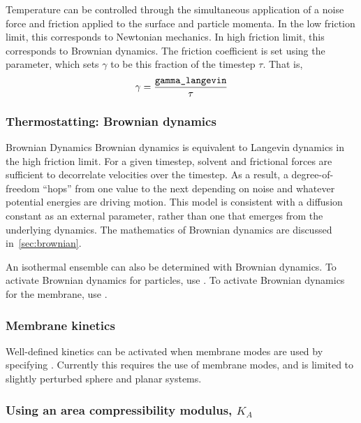 Temperature can be controlled through the simultaneous application of a noise force and friction applied to the surface and particle momenta.
In the low friction limit, this corresponds to Newtonian mechanics.
In high friction limit, this corresponds to Brownian dynamics.
The friction coefficient is set using the  parameter, which sets $\gamma$ to be this fraction of the timestep $\tau$.
That is,
\begin{equation}
\gamma = \frac{\textrm{\texttt{gamma\_langevin}}}{\tau} 
\end{equation} 

\subsubsection{Thermostatting: Brownian dynamics}

\begin{bcomment}{Brownian Dynamics}
Brownian dynamics is equivalent to Langevin dynamics in the high friction limit.
For a given timestep, solvent and frictional forces are sufficient to decorrelate velocities over the timestep.
As a result, a degree-of-freedom ``hops'' from one value to the next depending on noise and whatever potential energies are driving motion.
This model is consistent with a diffusion constant as an external parameter, rather than one that emerges from the underlying dynamics.  
The mathematics of Brownian dynamics are discussed in~\cref{sec:brownian}.
\end{bcomment}

An isothermal ensemble can also be determined with Brownian dynamics.
To activate Brownian dynamics for particles, use .
To activate Brownian dynamics for the membrane, use .

\subsubsection{Membrane kinetics}

Well-defined kinetics can be activated when membrane modes are used by specifying .
Currently this requires the use of membrane modes, and is limited to slightly perturbed sphere and planar systems. 

\subsubsection{Using an area compressibility modulus, $K_A$}

